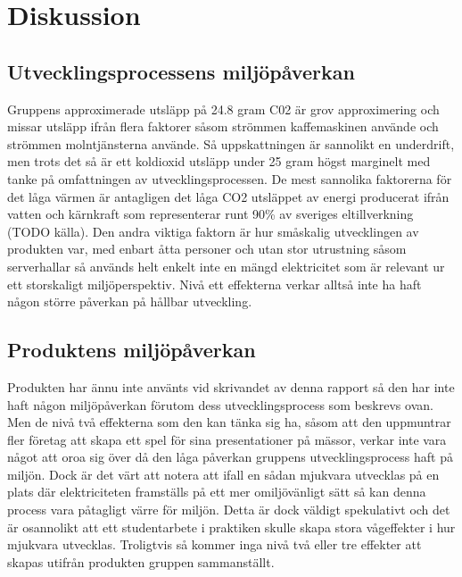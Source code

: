 
\section{Diskussion}
\label{sec:joel_a-discussion}

\subsection{Utvecklingsprocessens miljöpåverkan}
Gruppens approximerade utsläpp på 24.8 gram C02 är grov approximering och missar utsläpp ifrån flera faktorer såsom strömmen kaffemaskinen använde och strömmen molntjänsterna använde. Så uppskattningen är sannolikt en underdrift, men trots det så är ett koldioxid utsläpp under 25 gram högst marginelt med tanke på omfattningen av utvecklingsprocessen. De mest sannolika faktorerna för det låga värmen är antagligen det låga CO2 utsläppet av energi producerat ifrån vatten och kärnkraft som representerar runt 90\% av sveriges eltillverkning (TODO källa). Den andra viktiga faktorn är hur småskalig utvecklingen av produkten var, med enbart åtta personer och utan stor utrustning såsom serverhallar så används helt enkelt inte en mängd elektricitet som är relevant ur ett storskaligt miljöperspektiv. Nivå ett effekterna verkar alltså inte ha haft någon större påverkan på hållbar utveckling.


\subsection{Produktens miljöpåverkan}
Produkten har ännu inte använts vid skrivandet av denna rapport så den har inte haft någon miljöpåverkan förutom dess utvecklingsprocess som beskrevs ovan. Men de nivå två effekterna som den kan tänka sig ha, såsom att den uppmuntrar fler företag att skapa ett spel för sina presentationer på mässor, verkar inte vara något att oroa sig över då den låga påverkan gruppens utvecklingsprocess haft på miljön. Dock är det värt att notera att ifall en sådan mjukvara utvecklas på en plats där elektriciteten framställs på ett mer omiljövänligt sätt så kan denna process vara påtagligt värre för miljön. Detta är dock väldigt spekulativt och det är osannolikt att ett studentarbete i praktiken skulle skapa stora vågeffekter i hur mjukvara utvecklas. Troligtvis så kommer inga nivå två eller tre effekter att skapas utifrån produkten gruppen sammanställt.
